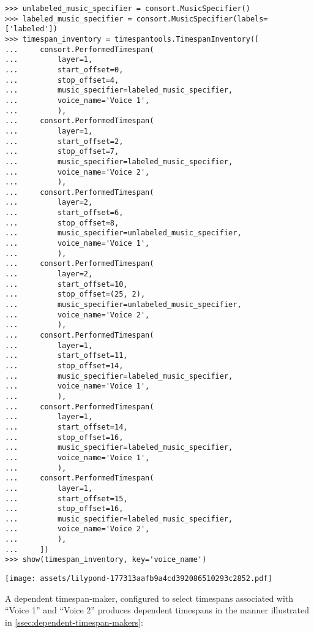\begin{abjadbookoutput}
\begin{singlespacing}
\vspace{-0.5\baselineskip}
\begin{verbatim}
>>> unlabeled_music_specifier = consort.MusicSpecifier()
>>> labeled_music_specifier = consort.MusicSpecifier(labels=['labeled'])
>>> timespan_inventory = timespantools.TimespanInventory([
...     consort.PerformedTimespan(
...         layer=1,
...         start_offset=0,
...         stop_offset=4,
...         music_specifier=labeled_music_specifier,
...         voice_name='Voice 1',
...         ),
...     consort.PerformedTimespan(
...         layer=1,
...         start_offset=2,
...         stop_offset=7,
...         music_specifier=labeled_music_specifier,
...         voice_name='Voice 2',
...         ),
...     consort.PerformedTimespan(
...         layer=2,
...         start_offset=6,
...         stop_offset=8,
...         music_specifier=unlabeled_music_specifier,
...         voice_name='Voice 1',
...         ),
...     consort.PerformedTimespan(
...         layer=2,
...         start_offset=10,
...         stop_offset=(25, 2),
...         music_specifier=unlabeled_music_specifier,
...         voice_name='Voice 2',
...         ),
...     consort.PerformedTimespan(
...         layer=1,
...         start_offset=11,
...         stop_offset=14,
...         music_specifier=labeled_music_specifier,
...         voice_name='Voice 1',
...         ),
...     consort.PerformedTimespan(
...         layer=1,
...         start_offset=14,
...         stop_offset=16,
...         music_specifier=labeled_music_specifier,
...         voice_name='Voice 1',
...         ),
...     consort.PerformedTimespan(
...         layer=1,
...         start_offset=15,
...         stop_offset=16,
...         music_specifier=labeled_music_specifier,
...         voice_name='Voice 2',
...         ),
...     ])
>>> show(timespan_inventory, key='voice_name')
\end{verbatim}
\noindent\texttt{[image: assets/lilypond-177313aafb9a4cd392086510293c2852.pdf]}
\end{singlespacing}
\end{abjadbookoutput}

\noindent A dependent timespan-maker, configured to select timespans associated
with \enquote{Voice 1} and \enquote{Voice 2} produces dependent timespans in
the manner illustrated in \autoref{ssec:dependent-timespan-makers}:

\begin{comment}
<abjad>
dependent_timespan_maker = consort.DependentTimespanMaker(
    include_inner_starts=True,
    voice_names=('Voice 1', 'Voice 2'),
    )
result = dependent_timespan_maker(
    layer=3,
    music_specifiers={'Voice 3': None},
    timespan_inventory=timespan_inventory[:],
    )
show(result, key='voice_name')
</abjad>
\end{comment}

